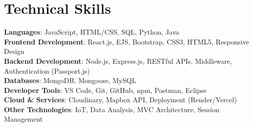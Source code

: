 \documentclass[letterpaper,11pt]{article}
\begin{document}
\section{Technical Skills}
 \begin{itemize}[leftmargin=0.15in, label={}]
    \small{\item{
     \textbf{Languages}{: JavaScript, HTML/CSS, SQL, Python, Java} \\
     \textbf{Frontend Development}{: React.js, EJS, Bootstrap, CSS3, HTML5, Responsive Design} \\
     \textbf{Backend Development}{: Node.js, Express.js, RESTful APIs, Middleware, Authentication (Passport.js)} \\
     \textbf{Databases}{: MongoDB, Mongoose, MySQL} \\
     \textbf{Developer Tools}{: VS Code, Git, GitHub, npm, Postman, Eclipse} \\
     \textbf{Cloud \& Services}{: Cloudinary, Mapbox API, Deployment (Render/Vercel)} \\
     \textbf{Other Technologies}{: IoT, Data Analysis, MVC Architecture, Session Management}
    }}
 \end{itemize}
 \vspace{-16pt}
\end{document}
